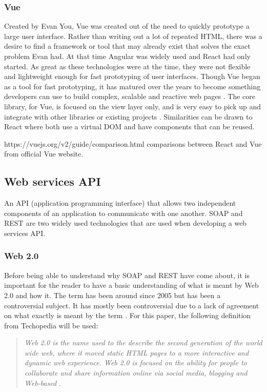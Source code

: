 \subsubsection{Vue}
Created by Evan You, Vue was created out of the need to quickly prototype a large user interface.
Rather than writing out a lot of repeated HTML, there was a desire to find a framework or tool that may already exist that solves the exact problem Evan had.
At that time Angular was widely used and React had only started. As great as these technologies were at the time, they were not flexible and lightweight
enough for fast prototyping of user interfaces. Though Vue began as a tool for fast prototyping, it has matured over the
years to become something developers can use to build complex, scalable and reactive web pages \cite{filipova2016learning}.
The core library, for Vue, is focused on the view layer only, and is very easy to pick up and integrate with other libraries or existing projects \cite{koetsier2016evaluation}.
Similarities can be drawn to React where both use a virtual DOM and have components that can be reused.

https://vuejs.org/v2/guide/comparison.html comparisons between React and Vue from official Vue website.


\subsection{Web services API} \label{web services}
An API (application programming interface) that allows two independent components of an application to communicate with one another.
SOAP and REST are two widely used technologies that are used when developing a web services API.

\subsubsection{Web 2.0}
Before being able to understand why SOAP and REST have come about, it is important for the reader to have a basic understanding of what is meant by Web 2.0 and how it.
The term has been around since 2005 but has been a controversial subject. It has mostly been controversial due to a lack of agreement on what exactly is meant
by the term \cite{constantinides2008web}. For this paper, the following definition from Techopedia will be used:
\begin{quotation}
    \noindent
    \textit{
        Web 2.0 is the name used to the describe the second generation of the world wide web, where it moved static HTML pages to a more interactive and 
        dynamic web experience.
        Web 2.0 is focused on the ability for people to collaborate and share information online via social media, blogging and Web-based
    }
    \cite{web2definition}. 
\end{quotation} 

